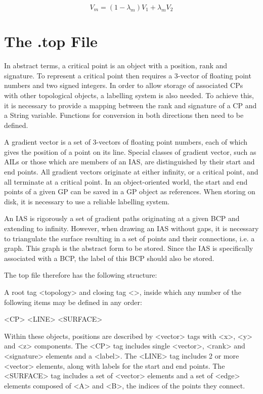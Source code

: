 \documentclass{report}
\begin{document}
\begin{equation}
V_{m} = (1 - \lambda_{m}) V_{1} + \lambda_{m} V_{2}
\end{equation}

\chapter{The .top File}

In abstract terms, a critical point is an object with a position, rank and signature.
To represent a critical point then requires a 3-vector of floating point numbers and two signed integers.
In order to allow storage of associated CPs with other topological objects, a labelling system is also needed.
To achieve this, it is necessary to provide a mapping between the rank and signature of a CP and a String variable.
Functions for conversion in both directions then need to be defined.

A gradient vector is a set of 3-vectors of floating point numbers, each of which gives the position of a point on its line.
Special classes of gradient vector, such as AILs or those which are members of an IAS, are distinguished by their start and end points.
All gradient vectors originate at either infinity, or a critical point, and all terminate at a critical point.
In an object-oriented world, the start and end points of a given GP can be saved in a GP object as references.
When storing on disk, it is necessary to use a reliable labelling system.

An IAS is rigorously a set of gradient paths originating at a given BCP and extending to infinity.
However, when drawing an IAS without gaps, it is necessary to triangulate the surface resulting in a set of points and their connections, i.e. a graph.
This graph is the abstract form to be stored. Since the IAS is specifically associated with a BCP, the label of this BCP should also be stored.

The top file therefore has the following structure:

A root tag <topology> and closing tag <\topology>, inside which any number of the following items may be defined in any order:

<CP>
<LINE>
<SURFACE>

Within these objects, positions are described by <vector> tags with <x>, <y> and <z> components.
The <CP> tag includes single <vector>, <rank> and <signature> elements and a <label>.
The <LINE> tag includes 2 or more <vector> elements, along with labels for the start and end points.
The <SURFACE> tag includes a set of <vector> elements and a set of <edge> elements composed of <A> and <B>, the indices of the points they connect.
\end{document}
